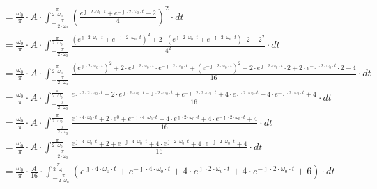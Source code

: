 \begin{align*}
&=\frac{\omega_0}{\pi} \cdot A \cdot \int_{-\frac{\pi}{2\cdot\omega_0}}^{\frac{\pi}{2\cdot\omega_0}} \left(  \frac{e^{\jmath \cdot 2 \cdot \omega_0 \cdot t}+e^{-\jmath \cdot 2 \cdot \omega_0 \cdot t}+2}{4} \right)^2 \cdot dt\\
&=\frac{\omega_0}{\pi} \cdot A \cdot \int_{-\frac{\pi}{2\cdot\omega_0}}^{\frac{\pi}{2\cdot\omega_0}} \frac{\left(e^{\jmath \cdot 2 \cdot \omega_0 \cdot t}+e^{-\jmath \cdot 2 \cdot \omega_0 \cdot t}\right)^2+2\cdot \left(e^{\jmath \cdot 2 \cdot \omega_0 \cdot t}+e^{-\jmath \cdot 2 \cdot \omega_0 \cdot t}\right) \cdot 2 + 2^2}{4^2} \cdot dt\\
&=\frac{\omega_0}{\pi} \cdot A \cdot \int_{-\frac{\pi}{2\cdot\omega_0}}^{\frac{\pi}{2\cdot\omega_0}} \frac{\left(e^{\jmath \cdot 2 \cdot \omega_0 \cdot t}\right)^2+2\cdot e^{\jmath \cdot 2 \cdot \omega_0 \cdot t}\cdot e^{-\jmath \cdot 2 \cdot \omega_0 \cdot t} +\left(e^{-\jmath \cdot 2 \cdot \omega_0 \cdot t}\right)^2+2\cdot e^{\jmath \cdot 2 \cdot \omega_0 \cdot t}\cdot 2 +2\cdot e^{-\jmath \cdot 2 \cdot \omega_0 \cdot t} \cdot 2 + 4}{16} \cdot dt\\
&=\frac{\omega_0}{\pi} \cdot A \cdot \int_{-\frac{\pi}{2\cdot\omega_0}}^{\frac{\pi}{2\cdot\omega_0}} \frac{e^{\jmath \cdot 2 \cdot 2 \cdot \omega_0 \cdot t}+2\cdot e^{\jmath \cdot 2 \cdot \omega_0 \cdot t -\jmath \cdot 2 \cdot \omega_0 \cdot t} +e^{-\jmath \cdot 2 \cdot 2 \cdot \omega_0 \cdot t} +4\cdot e^{\jmath \cdot 2 \cdot \omega_0 \cdot t} +4\cdot e^{-\jmath \cdot 2 \cdot \omega_0 \cdot t} + 4}{16} \cdot dt\\
&=\frac{\omega_0}{\pi} \cdot A \cdot \int_{-\frac{\pi}{2\cdot\omega_0}}^{\frac{\pi}{2\cdot\omega_0}} \frac{e^{\jmath \cdot 4 \cdot \omega_0 \cdot t}+2\cdot e^{0} +e^{-\jmath \cdot 4 \cdot \omega_0 \cdot t} +4\cdot e^{\jmath \cdot 2 \cdot \omega_0 \cdot t} +4\cdot e^{-\jmath \cdot 2 \cdot \omega_0 \cdot t} + 4}{16} \cdot dt\\
&=\frac{\omega_0}{\pi} \cdot A \cdot \int_{-\frac{\pi}{2\cdot\omega_0}}^{\frac{\pi}{2\cdot\omega_0}} \frac{e^{\jmath \cdot 4 \cdot \omega_0 \cdot t}+2 +e^{-\jmath \cdot 4 \cdot \omega_0 \cdot t} +4\cdot e^{\jmath \cdot 2 \cdot \omega_0 \cdot t} +4\cdot e^{-\jmath \cdot 2 \cdot \omega_0 \cdot t} + 4}{16} \cdot dt\\
&=\frac{\omega_0}{\pi} \cdot \frac{A}{16} \cdot \int_{-\frac{\pi}{2\cdot\omega_0}}^{\frac{\pi}{2\cdot\omega_0}} \left( e^{\jmath \cdot 4 \cdot \omega_0 \cdot t}+e^{-\jmath \cdot 4 \cdot \omega_0 \cdot t} +4\cdot e^{\jmath \cdot 2 \cdot \omega_0 \cdot t} +4\cdot e^{-\jmath \cdot 2 \cdot \omega_0 \cdot t} + 6\right)\cdot dt\\

\end{align*}
